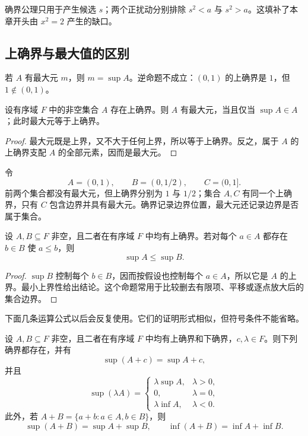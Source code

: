 确界公理只用于产生候选 \(s\)；两个正扰动分别排除 \(s^2<a\) 与 \(s^2>a\)。这填补了本章开头由 \(x^2=2\) 产生的缺口。

\subsection{上确界与最大值的区别}


若 \(A\) 有最大元 \(m\)，则 \(m=\sup A\)。逆命题不成立：\((0,1)\) 的上确界是 \(1\)，但 \(1\notin(0,1)\)。

\begin{proposition}
设有序域 \(F\) 中的非空集合 \(A\) 存在上确界。则 \(A\) 有最大元，当且仅当 \(\sup A\in A\)；此时最大元等于上确界。
\end{proposition}

\begin{proof}
最大元既是上界，又不大于任何上界，所以等于上确界。反之，属于 \(A\) 的上确界支配 \(A\) 的全部元素，因而是最大元。
\end{proof}

\begin{example}[边界位置与边界归属]
令
\[
 A=(0,1),\qquad B=(0,1/2),\qquad C=(0,1]\!.
\]
前两个集合都没有最大元，但上确界分别为 \(1\) 与 \(1/2\)；集合 \(A,C\) 有同一个上确界，只有 \(C\) 包含边界并具有最大元。确界记录边界位置，最大元还记录边界是否属于集合。
\end{example}

\begin{proposition}[确界的稳定比较]
设 \(A,B\subseteq F\) 非空，且二者在有序域 \(F\) 中均有上确界。若对每个 \(a\in A\) 都存在 \(b\in B\) 使 \(a\le b\)，则
\[
 \sup A\le\sup B.
\]
\end{proposition}

\begin{proof}
\(\sup B\) 控制每个 \(b\in B\)，因而按假设也控制每个 \(a\in A\)，所以它是 \(A\) 的上界。最小上界性给出结论。这个命题常用于比较删去有限项、平移或逐点放大后的集合边界。
\end{proof}

下面几条运算公式以后会反复使用。它们的证明形式相似，但符号条件不能省略。

\begin{proposition}[确界的代数运算]
设 \(A,B\subseteq F\) 非空，且二者在有序域 \(F\) 中均有上确界和下确界，\(c,\lambda\in F\)。则下列确界都存在，并有
\[
 \sup(A+c)=\sup A+c,
\]
并且
\[
 \sup(\lambda A)=
 \begin{cases}
   \lambda\sup A,&\lambda>0,\\
   0,&\lambda=0,\\
   \lambda\inf A,&\lambda<0.
 \end{cases}
\]
此外，若 \(A+B=\{a+b:a\in A,b\in B\}\)，则
\[
  \sup(A+B)=\sup A+\sup B,\qquad
  \inf(A+B)=\inf A+\inf B.
\]
\end{proposition}

